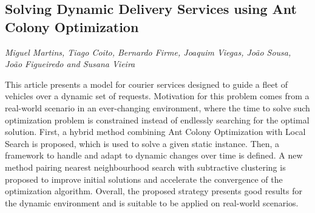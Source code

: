 \documentclass[../booklet.tex]{subfiles}
\begin{document}
\subsection[Solving Dynamic Delivery Services using Ant Colony Optimization. {\it Miguel Martins, Tiago Coito, Bernardo Firme, Joaquim Viegas, João Sousa, João Figueiredo and Susana Vieira}]{Solving Dynamic Delivery Services using Ant Colony Optimization}
      

\begin{center}
  {\it Miguel Martins, Tiago Coito, Bernardo Firme, Joaquim Viegas, João Sousa, João Figueiredo and Susana Vieira}
\end{center}



This article presents a model for courier services designed to guide a fleet of vehicles over a dynamic set of requests.
Motivation for this problem comes from a real-world scenario in an ever-changing environment, where the time to solve such optimization problem is constrained instead of  endlessly searching for the optimal solution. 
First, a hybrid method combining Ant Colony Optimization with Local Search is proposed, which is used to solve a given static instance.
Then, a framework to handle and adapt to dynamic changes over time is defined. 
A new method pairing nearest neighbourhood search with subtractive clustering is proposed to improve initial solutions and accelerate the convergence of the optimization algorithm.
Overall, the proposed strategy presents good results for the dynamic environment and is suitable to be applied on real-world scenarios.

\end{document}
